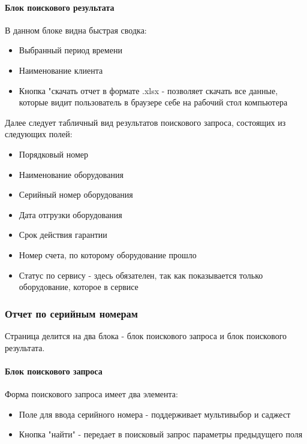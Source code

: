 \documentclass[DIV=calc, paper=a4, fontsize=11pt]{scrartcl} %
\begin{document}
\paragraph{Блок поискового результата}
В данном блоке видна быстрая сводка:

\begin{itemize}
	\item Выбранный период времени
	\item Наименование клиента
	\item Кнопка "скачать отчет в формате .xlsx - позволяет скачать все данные, которые видит пользователь в браузере себе на рабочий стол компьютера
\end{itemize}

Далее следует табличный вид результатов поискового запроса, состоящих из следующих полей:

\begin{itemize}
	\item Порядковый номер
	\item Наименование оборудования
	\item Серийный номер оборудования
	\item Дата отгрузки оборудования
	\item Срок действия гарантии
	\item Номер счета, по которому оборудование прошло
	\item Статус по сервису - здесь обязателен, так как показывается только оборудование, которое в сервисе
\end{itemize}


\subsubsection{Отчет по серийным номерам}

Страница делится на два блока - блок поискового запроса и блок поискового результата.
\paragraph{Блок поискового запроса}
Форма поискового запроса имеет два элемента:

\begin{itemize}
	\item Поле для ввода серийного номера  - поддерживает мультивыбор и саджест
	\item Кнопка "найти" - передает в поисковый запрос параметры предыдущего поля
\end{itemize}
\end{document}
